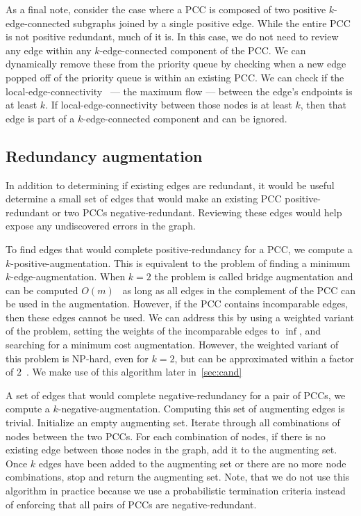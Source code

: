 As a final note, consider the case where a PCC is composed of two positive $k$-edge-connected subgraphs joined by
  a single positive edge.
While the entire PCC is not positive redundant, much of it is.
In this case, we do not need to review any edge within any $k$-edge-connected component of the PCC.
We can dynamically remove these from the priority queue by checking when a new edge popped off of the priority
  queue is within an existing PCC.
We can check if the local-edge-connectivity~\cite{esfahanian_connectivity_2017} --- \ie{} the maximum flow ---
  between the edge's endpoints is at least $k$.
If local-edge-connectivity between those nodes is at least $k$, then that edge is part of a $k$-edge-connected
  component and can be ignored.


\subsection{Redundancy augmentation}\label{subsec:augredun}

In addition to determining if existing edges are redundant, it would be useful determine a small set of edges
  that would make an existing PCC positive-redundant or two PCCs negative-redundant.
Reviewing these edges would help expose any undiscovered errors in the graph.

To find edges that would complete positive-redundancy for a PCC, we compute a $k$-positive-augmentation.
This is equivalent to the problem of finding a minimum $k$-edge-augmentation.
When $k=2$ the problem is called bridge augmentation and can be computed $O(m)$~\cite{eswaran_augmentation_1976}
  as long as all edges in the complement of the PCC can be used in the augmentation.
However, if the PCC contains incomparable edges, then these edges cannot be used.
We can address this by using a weighted variant of the problem, setting the weights of the incomparable edges to
  $\inf$, and searching for a minimum cost augmentation.
However, the weighted variant of this problem is NP-hard, even for $k=2$, but can be approximated within a factor
  of $2$~\cite{khuller_approximation_1993}.
We make use of this algorithm later in~\cref{sec:cand}

A set of edges that would complete negative-redundancy for a pair of PCCs, we compute a
  $k$-negative-augmentation.
Computing this set of augmenting edges is trivial.
Initialize an empty augmenting set.
Iterate through all combinations of nodes between the two PCCs.
For each combination of nodes, if there is no existing edge between those nodes in the graph, add it to the
  augmenting set.
Once $k$ edges have been added to the augmenting set or there are no more node combinations, stop and return the
  augmenting set.
Note, that we do not use this algorithm in practice because we use a probabilistic termination criteria instead
  of enforcing that all pairs of PCCs are negative-redundant.

